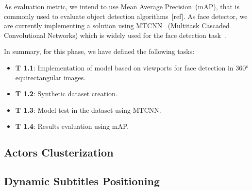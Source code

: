 As evaluation metric, we intend to use Mean Average Precision~(mAP), that is commonly used to evaluate object detection algorithms~[ref]. As face detector, we are currently implementing a solution using MTCNN~\cite{mtcnn} (Multitask Cascaded Convolutional Networks) which is widely used for the face detection task~\cite{mtcnn1, mtcnn2, mtcnn3}. %

In summary, for this phase, we have defined the following tasks:

\begin{itemize}
    \item \textbf{T 1.1}: Implementation of model based on viewports for face detection in 360° equirectangular images.
    \item \textbf{T 1.2}: Synthetic dataset creation.
    \item \textbf{T 1.3}: Model test in the dataset using MTCNN.
    \item \textbf{T 1.4}: Results evaluation using mAP.
\end{itemize}


\subsection{Actors Clusterization}



\subsection{Dynamic Subtitles Positioning}

